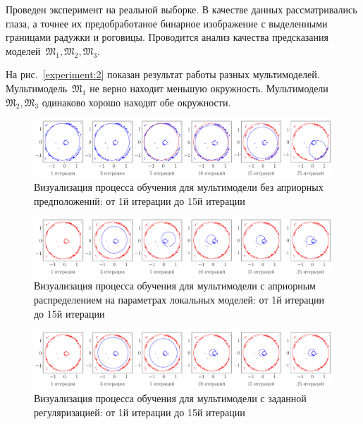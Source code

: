 \documentclass[12pt, twoside]{article}
\numberwithin{equation}{section}
\begin{document}
Проведен эксперимент на реальной выборке. В качестве данных рассматривались глаза, а точнее их предобработаное бинарное изображение с выделенными границами радужки и роговицы. Проводится анализ качества предсказания моделей~$\mathfrak{M}_1, \mathfrak{M}_2, \mathfrak{M}_3$.

На рис.~\ref{experiment:2} показан результат работы разных мультимоделей. Мультимодель~$\mathfrak{M}_1$ не верно находит меньшую окружность. Мультимодели~$\mathfrak{M}_2, \mathfrak{M}_3$ одинаково хорошо находят обе окружности.


\begin{figure}[h!t]\center
\includegraphics[width=1\textwidth]{result/experiment_real_not_prior}
\caption{Визуализация процесса обучения для мультимодели без априорных предположений: от 1й итерации до 15й итерации}
\label{experiment:3}
\end{figure}

\begin{figure}[h!t]\center
\includegraphics[width=1\textwidth]{result/experiment_real_prior}
\caption{Визуализация процесса обучения для мультимодели с априорным распределением на параметрах локальных моделей: от 1й итерации до 15й итерации}
\label{experiment:4}
\end{figure}

\begin{figure}[h!t]\center
\includegraphics[width=1\textwidth]{result/experiment_real_regular}
\caption{Визуализация процесса обучения для мультимодели с заданной регуляризацией: от 1й итерации до 15й итерации}
\label{experiment:5}
\end{figure}
\end{document}
